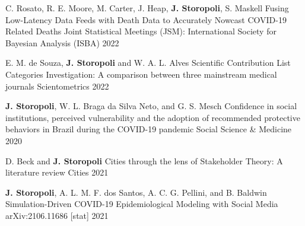 

\begin{cventries}

  \cventry
    {C. Rosato, R. E. Moore, M. Carter, J. Heap, \textbf{J. Storopoli}, S. Maskell} %
    {Fusing Low-Latency Data Feeds with Death Data to Accurately Nowcast COVID-19 Related Deaths} %
    {Joint Statistical Meetings (JSM): International Society for Bayesian Analysis (ISBA)} %
    {2022} %

  \cventry
    {E. M. de Souza, \textbf{J. Storopoli} and W. A. L. Alves} %
    {Scientific Contribution List Categories Investigation: A comparison between three mainstream medical journals} %
    {Scientometrics} %
    {2022} %

  \cventry
    {\textbf{J. Storopoli}, W. L. Braga da Silva Neto, and G. S. Mesch} %
    {Confidence in social institutions, perceived vulnerability and the adoption of recommended protective behaviors in Brazil during the COVID-19 pandemic} %
    {Social Science \& Medicine} %
    {2020} %

  \cventry
    {D. Beck and \textbf{J. Storopoli}} %
    {Cities through the lens of Stakeholder Theory: A literature review} %
    {Cities} %
    {2021} %

  \cventry
    {\textbf{J. Storopoli}, A. L. M. F. dos Santos, A. C. G. Pellini, and B. Baldwin} %
    {Simulation-Driven COVID-19 Epidemiological Modeling with Social Media} %
    {arXiv:2106.11686 [stat]} %
    {2021} %

\end{cventries}
